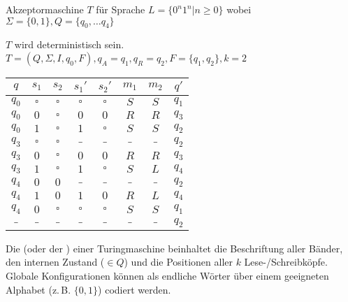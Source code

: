 \begin{beispiel}
\label{nullenundeinsen}

    Akzeptormaschine $T$ für Sprache $L = \{ 0^n 1^n | n \geq 0 \}$ wobei $\Sigma= \{0,1\}, Q = \{q_0, \dots q_4 \}$

    $T$ wird deterministisch sein. $T = (Q, \Sigma, I, q_0, F), q_A = q_1, q_R = q_2, F = \{q_1, q_2\}, k=2$

    \vspace{2pt}
    \begin{tabular}{|c|c|c|c|c|c|c|c|}\hline
    \rowcolor{grau} $q$   & $s_1$     & $s_2$     & $s_1'$    & $s_2'$    & $m_1$ & $m_2$ & $q'$    \\\hline
                    $q_0$ & $\square$ & $\square$ & $\square$ & $\square$ & $S$   & $S$   & $q_1$   \\\hline
                    $q_0$ & $0$       & $\square$ & $0$       & $0$       & $R$   & $R$   & $q_3$   \\\hline
                    $q_0$ & $1$       & $\square$ & $1$       & $\square$ & $S$   & $S$   & $q_2$   \\\hline
                    $q_3$ & $\square$ & $\square$ & $\_$      & $\_$      & $\_$  & $\_$  & $q_2$   \\\hline
                    $q_3$ & $0$       & $\square$ & $0$       & $0$       & $R$   & $R$   & $q_3$   \\\hline
                    $q_3$ & $1$       & $\square$ & $1$       & $\square$ & $S$   & $L$   & $q_4$   \\\hline
                    $q_4$ & $0$       & $0$       & $\_$      & $\_$      & $\_$  & $\_$  & $q_2$   \\\hline
                    $q_4$ & $1$       & $0$       & $1$       & $0$       & $R$   & $L$   & $q_4$   \\\hline
                    $q_4$ & $0$       & $\square$ & $\square$ & $\square$ & $S$   & $S$   & $q_1$   \\\hline
                    $\_$  & $\_$      & $\_$      & $\_$      & $\_$      & $\_$  & $\_$  & $q_2$   \\\hline
    \end{tabular}

\end{beispiel}


Die  (oder der ) einer Turingmaschine beinhaltet die Beschriftung aller Bänder, den internen Zustand ($\in Q$) und die Positionen aller $k$ Lese-/Schreibköpfe. Globale Konfigurationen können als endliche Wörter über einem geeigneten Alphabet (z.\,B. $\{0,1\}$) codiert werden.


